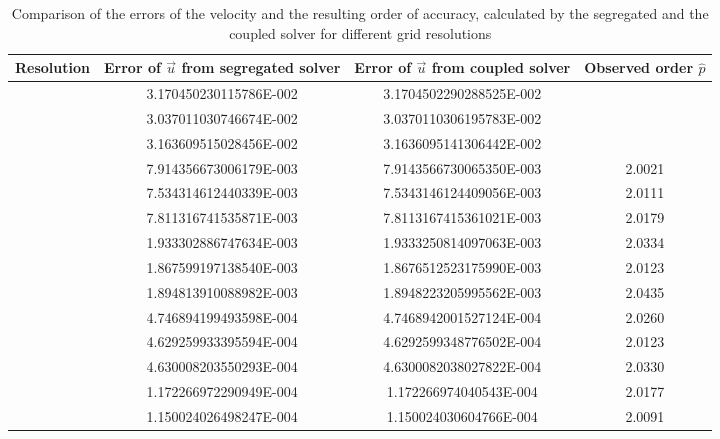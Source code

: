 \begin{table}[h!]\centering
{}
  \caption{Comparison of the errors of the velocity and the resulting order of accuracy, calculated by the segregated and the coupled solver for different grid resolutions}
  \begin{tabular}{cccc}\toprule
    Resolution & Error of \(\vec{u}\) from segregated solver & Error of \(\vec{u}\) from coupled solver & Observed order \(\hat{p}\) \\
    \midrule
    \rowcolor{tud0a}\multirow{3}{*}{}          &    3.170450230115786E-002 & 3.1704502290288525E-002 &  \\
    \rowcolor{tud0a}                           &    3.037011030746674E-002 & 3.0370110306195783E-002 &  \\
    \rowcolor{tud0a} \multirow{-3}{*}{8x8x8}   &    3.163609515028456E-002 & 3.1636095141306442E-002 &  \\ %
    \rowcolor{black!00}\multirow{3}{*}{}          &    7.914356673006179E-003 & 7.9143566730065350E-003 & 2.0021  \\
    \rowcolor{black!00}                           &    7.534314612440339E-003 & 7.5343146124409056E-003 & 2.0111  \\
    \rowcolor{black!00} \multirow{-3}{*}{16x16x16}&    7.811316741535871E-003 & 7.8113167415361021E-003 & 2.0179  \\ %
    \rowcolor{tud0a}\multirow{3}{*}{}          &    1.933302886747634E-003 & 1.9333250814097063E-003 & 2.0334  \\
    \rowcolor{tud0a}                           &    1.867599197138540E-003 & 1.8676512523175990E-003 & 2.0123  \\
    \rowcolor{tud0a} \multirow{-3}{*}{32x32x32}&    1.894813910088982E-003 & 1.8948223205995562E-003 & 2.0435  \\ %
    \rowcolor{black!00}\multirow{3}{*}{}          &    4.746894199493598E-004 & 4.7468942001527124E-004 & 2.0260 \\
    \rowcolor{black!00}                           &    4.629259933395594E-004 & 4.6292599348776502E-004 & 2.0123 \\
    \rowcolor{black!00} \multirow{-3}{*}{64x64x64}&    4.630008203550293E-004 & 4.6300082038027822E-004 & 2.0330 \\ %
    \rowcolor{tud0a}\multirow{3}{*}{}             & 1.172266972290949E-004 & 1.172266974040543E-004 & 2.0177  \\
    \rowcolor{tud0a}                              & 1.150024026498247E-004 & 1.150024030604766E-004 & 2.0091  \\

\end{tabular}
\end{table}
